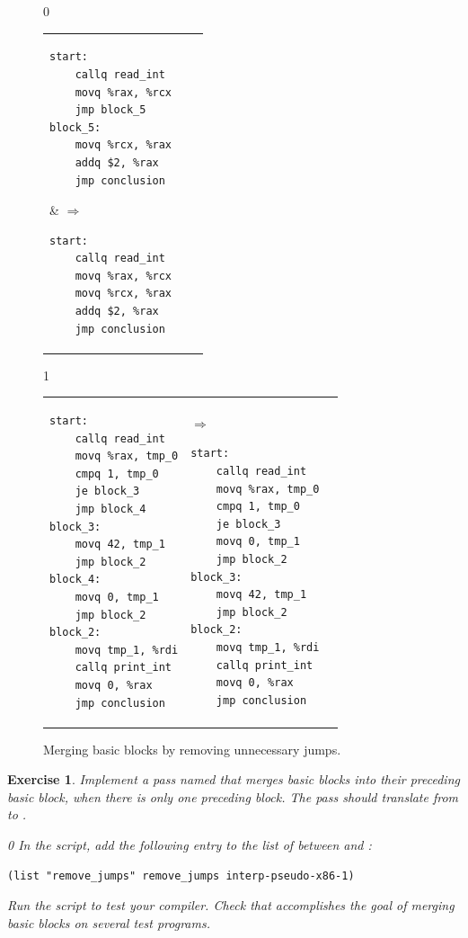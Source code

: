 \documentclass[7x10]{TimesAPriori_MIT}%
\def\racketEd{0}
\def\pythonEd{1}
\def\edition{1}
\newcommand{\pythonColor}[0]{}
\newtheorem{exercise}[theorem]{Exercise}
\numberwithin{theorem}{chapter}
\numberwithin{definition}{chapter}
\numberwithin{equation}{chapter}
\begin{document}
\begin{figure}[tbp]
\begin{tcolorbox}[colback=white]
{\if\edition\racketEd        
\begin{tabular}{lll}
\begin{minipage}{0.5\textwidth}
\begin{lstlisting}
start:
    callq read_int
    movq %rax, %rcx
    jmp block_5
block_5:
    movq %rcx, %rax
    addq $2, %rax
    jmp conclusion
\end{lstlisting}
\end{minipage}
&
$\Rightarrow\qquad$
\begin{minipage}{0.4\textwidth}
\begin{lstlisting}
start:
    callq read_int
    movq %rax, %rcx
    movq %rcx, %rax
    addq $2, %rax
    jmp conclusion
\end{lstlisting}
\end{minipage}
\end{tabular}
\fi}
{\if\edition\pythonEd\pythonColor
\begin{tabular}{lll}
\begin{minipage}{0.5\textwidth}
\begin{lstlisting}
start:
	callq read_int
	movq %rax, tmp_0
	cmpq 1, tmp_0
	je block_3
	jmp block_4
block_3:
	movq 42, tmp_1
	jmp block_2
block_4:
	movq 0, tmp_1
	jmp block_2
block_2:
	movq tmp_1, %rdi
	callq print_int
	movq 0, %rax
	jmp conclusion
\end{lstlisting}
\end{minipage}
&
$\Rightarrow\qquad$
\begin{minipage}{0.4\textwidth}
\begin{lstlisting}
start:
	callq read_int
	movq %rax, tmp_0
	cmpq 1, tmp_0
	je block_3
	movq 0, tmp_1
	jmp block_2
block_3:
	movq 42, tmp_1
	jmp block_2
block_2:
	movq tmp_1, %rdi
	callq print_int
	movq 0, %rax
	jmp conclusion
\end{lstlisting}
\end{minipage}
\end{tabular}
\fi}
\end{tcolorbox}

\caption{Merging basic blocks by removing unnecessary jumps.}
\label{fig:remove-jumps}
\end{figure}

\begin{exercise}\normalfont\normalsize
%
Implement a pass named  that merges basic blocks
into their preceding basic block, when there is only one preceding
block. The pass should translate from \LangXIfVar{} to \LangXIfVar{}.
%
{\if\edition\racketEd        
In the  script, add the following entry to the
list of  between 
and :
\begin{lstlisting}
(list "remove_jumps" remove_jumps interp-pseudo-x86-1)
\end{lstlisting}
\fi}
%
Run the script to test your compiler.
%
Check that  accomplishes the goal of merging basic
blocks on several test programs.
\end{exercise}
\end{document}
